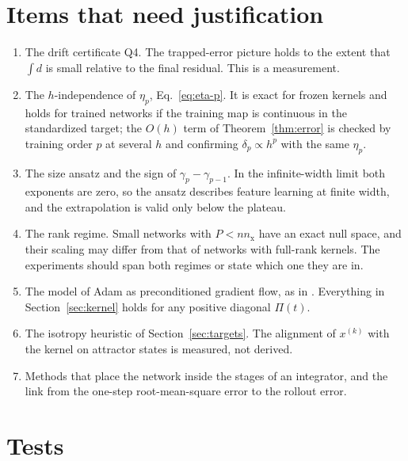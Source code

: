 \documentclass[11pt]{article}
\theoremstyle{definition}
\theoremstyle{remark}
\begin{document}
\section{Items that need justification}\label{sec:open}

\begin{enumerate}[label=J\arabic*.]
\item The drift certificate Q4. The trapped-error picture holds to the extent that $\int d$ is small relative to the final residual. This is a measurement.
\item The $h$-independence of $\eta_p$, Eq.~\eqref{eq:eta-p}. It is exact for frozen kernels and holds for trained networks if the training map is continuous in the standardized target; the $O(h)$ term of Theorem~\ref{thm:error} is checked by training order $p$ at several $h$ and confirming $\delta_p \propto h^p$ with the same $\eta_p$.
\item The size ansatz and the sign of $\gamma_p - \gamma_{p-1}$. In the infinite-width limit both exponents are zero, so the ansatz describes feature learning at finite width, and the extrapolation is valid only below the plateau.
\item The rank regime. Small networks with $P < nn_{\mathrm x}$ have an exact null space, and their scaling may differ from that of networks with full-rank kernels. The experiments should span both regimes or state which one they are in.
\item The model of Adam as preconditioned gradient flow, as in \cite{ainslie2026spectral}. Everything in Section~\ref{sec:kernel} holds for any positive diagonal $\Pi(t)$.
\item The isotropy heuristic of Section~\ref{sec:targets}. The alignment of $x^{(k)}$ with the kernel on attractor states is measured, not derived.
\item Methods that place the network inside the stages of an integrator, and the link from the one-step root-mean-square error to the rollout error.
\end{enumerate}

\section{Tests}\label{sec:tests}
\end{document}
